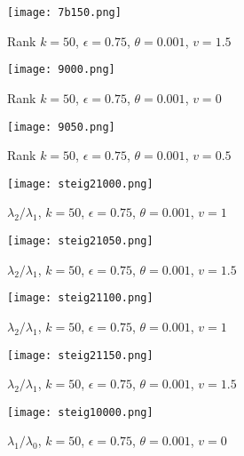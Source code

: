 \documentclass[a4paper,11pt,twoside]{article}
\theoremstyle{definition}
\theoremstyle{remark}
\begin{document}
\begin{figure}[!h]
  \caption{Rank $k = 50$, $\epsilon = 0.75$, $\theta = 0.001$, $v = 1.5$}
  \centering
    \texttt{[image: 7b150.png]}
    \label{7150}
\end{figure}
\newpage
\begin{figure}[!h]
  \caption{Rank $k = 50$, $\epsilon = 0.75$, $\theta = 0.001$, $v = 0$}
  \centering
    \texttt{[image: 9000.png]}
    \label{9000}
\end{figure}

\begin{figure}[!h]
  \caption{Rank $k = 50$, $\epsilon = 0.75$, $\theta = 0.001$, $v = 0.5$}
  \centering
    \texttt{[image: 9050.png]}
    \label{9050}
\end{figure}
\newpage 
\begin{figure}[!h]
  \caption{$\lambda_2/\lambda_1$, $k = 50$, $\epsilon = 0.75$, $\theta = 0.001$, $v = 1$}
  \centering
    \texttt{[image: steig21000.png]}
    \label{steig21000}
\end{figure}

\begin{figure}[!h]
  \caption{$\lambda_2/\lambda_1$, $k = 50$, $\epsilon = 0.75$, $\theta = 0.001$, $v = 1.5$}
  \centering
    \texttt{[image: steig21050.png]}
    \label{steig21050}
\end{figure}
\newpage
\begin{figure}[!h]
  \caption{$\lambda_2/\lambda_1$, $k = 50$, $\epsilon = 0.75$, $\theta = 0.001$, $v = 1$}
  \centering
    \texttt{[image: steig21100.png]}
    \label{steig21100}
\end{figure}

\begin{figure}[!h]
  \caption{$\lambda_2/\lambda_1$, $k = 50$, $\epsilon = 0.75$, $\theta = 0.001$, $v = 1.5$}
  \centering
    \texttt{[image: steig21150.png]}
    \label{steig21150}
\end{figure}
\newpage
\begin{figure}[!h]
  \caption{$\lambda_1/\lambda_0$, $k = 50$, $\epsilon = 0.75$, $\theta = 0.001$, $v = 0$}
  \centering
    \texttt{[image: steig10000.png]}
    \label{steig10000}
\end{figure}
\end{document}
